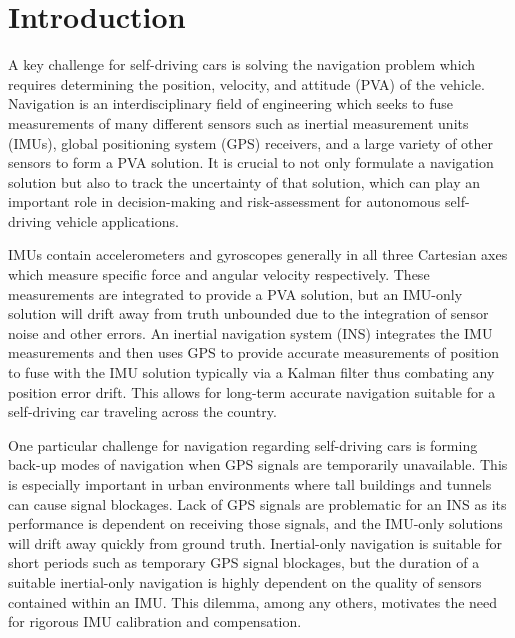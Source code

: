 
\begingroup
\allowdisplaybreaks

\section{Introduction}

A key challenge for self-driving cars is solving the navigation problem which requires determining the position, velocity, and attitude (PVA) of the vehicle. Navigation is an interdisciplinary field of engineering which seeks to fuse measurements of many different sensors such as inertial measurement units (IMUs), global positioning system (GPS) receivers, and a large variety of other sensors to form a PVA solution. It is crucial to not only formulate a navigation solution but also to track the uncertainty of that solution, which can play an important role in decision-making and risk-assessment for autonomous self-driving vehicle applications.

IMUs contain accelerometers and gyroscopes generally in all three Cartesian axes which measure specific force and angular velocity respectively. These measurements are integrated to provide a PVA solution, but an IMU-only solution will drift away from truth unbounded due to the integration of sensor noise and other errors. An inertial navigation system (INS) integrates the IMU measurements and then uses GPS to provide accurate measurements of position to fuse with the IMU solution typically via a Kalman filter thus combating any position error drift. This allows for long-term accurate navigation suitable for a self-driving car traveling across the country.

One particular challenge for navigation regarding self-driving cars is forming back-up modes of navigation when GPS signals are temporarily unavailable. This is especially important in urban environments where tall buildings and tunnels can cause signal blockages. Lack of GPS signals are problematic for an INS as its performance is dependent on receiving those signals, and the IMU-only solutions will drift away quickly from ground truth. Inertial-only navigation is suitable for short periods such as temporary GPS signal blockages, but the duration of a suitable inertial-only navigation is highly dependent on the quality of sensors contained within an IMU. This dilemma, among any others, motivates the need for rigorous IMU calibration and compensation.


